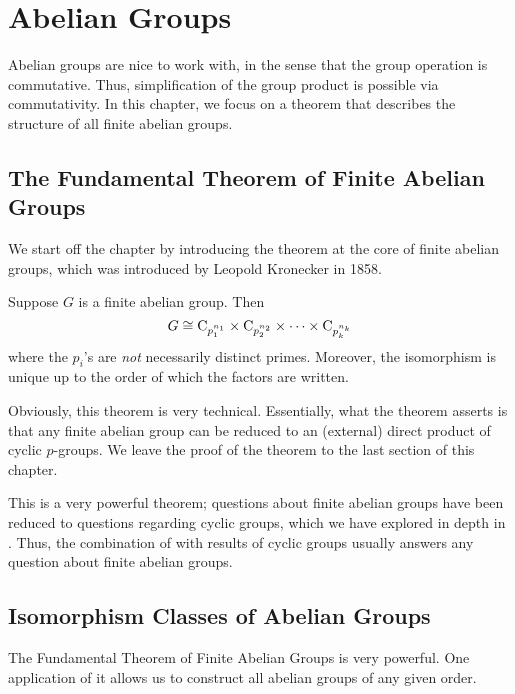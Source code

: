 \chapter{Abelian Groups}
Abelian groups are nice to work with, in the sense that the group operation is commutative. Thus, simplification of the group product is possible via commutativity. In this chapter, we focus on a theorem that describes the structure of all finite abelian groups.

\section{The Fundamental Theorem of Finite Abelian Groups}
We start off the chapter by introducing the theorem at the core of finite abelian groups, which was introduced by Leopold Kronecker in 1858.

\begin{theorem}\label{thrm-fundamental-theorem-of-finite-abelian-groups}
    Suppose $G$ is a finite abelian group. Then
    \[
        G \cong \mathrm{C}_{p_1^{n_1}} \times \mathrm{C}_{p_2^{n_2}} \times \cdots \times \mathrm{C}_{p_k^{n_k}}
    \]
    where the $p_i$'s are \textit{not} necessarily distinct primes. Moreover, the isomorphism is unique up to the order of which the factors are written.
\end{theorem}

Obviously, this theorem is very technical. Essentially, what the theorem asserts is that any finite abelian group can be reduced to an (external) direct product of cyclic $p$-groups. We leave the proof of the theorem to the last section of this chapter.

This is a very powerful theorem; questions about finite abelian groups have been reduced to questions regarding cyclic groups, which we have explored in depth in . Thus, the combination of  with results of cyclic groups usually answers any question about finite abelian groups.

\section{Isomorphism Classes of Abelian Groups}
The Fundamental Theorem of Finite Abelian Groups is very powerful. One application of it allows us to construct all abelian groups of any given order.

